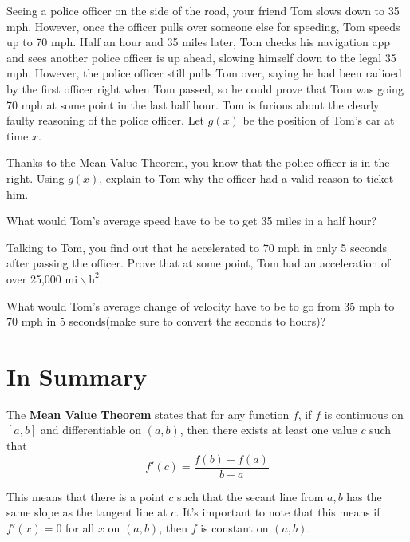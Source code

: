\documentclass{ximera}
\begin{document}
\begin{question}
Seeing a police officer on the side of the road, your friend Tom slows down to 35 mph. However, once the officer pulls over someone else for speeding, Tom speeds up to 70 mph. Half an hour and 35 miles later, Tom checks his navigation app and sees another police officer is up ahead, slowing himself down to the legal 35 mph. However, the police officer still pulls Tom over, saying he had been radioed by the first officer right when Tom passed, so he could prove that Tom was going 70 mph at some point in the last half hour. Tom is furious about the clearly faulty reasoning of the police officer. Let $g(x)$ be the position of Tom's car at time $x$.

Thanks to the Mean Value Theorem, you know that the police officer is in the right. Using $g(x)$, explain to Tom why the officer had a valid reason to ticket him.
\begin{hint}
What would Tom's average speed have to be to get 35 miles in a half hour?
\end{hint}

\begin{freeResponse}
\end{freeResponse}

Talking to Tom, you find out that he accelerated to 70 mph in only 5 seconds after passing the officer. Prove that at some point, Tom had an acceleration of over 25,000 $\text{mi} \backslash \text{h}^2$.
\begin{hint}
What would Tom's average change of velocity have to be to go from 35 mph to 70 mph in 5 seconds(make sure to convert the seconds to hours)?
\end{hint}
\begin{freeResponse}
\end{freeResponse}
\end{question}

\section{In Summary}

\begin{theorem}
The \textbf{Mean Value Theorem} states that for any function $f$, if $f$ is continuous on $[a,b]$ and differentiable on $(a,b)$, then there exists at least one value $c$ such that $$f'(c)=\frac{f(b)-f(a)}{b-a}$$

This means that there is a point $c$ such that the secant line from $a, b$ has the same slope as the tangent line at $c$. It's important to note that this means if $f'(x)=0$ for all $x$ on $(a,b)$, then $f$ is constant on $(a,b)$.
\end{theorem}
\end{document}
